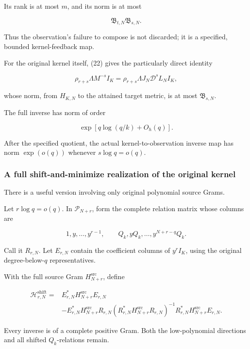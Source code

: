 \documentclass[11pt]{article}
\begin{document}
Its rank is at most \(m\), and its norm is at most

\[
\mathfrak B_{t,N}\mathfrak B_{s,N}.
\]

Thus the observation's failure to compose is not discarded; it is a specified, bounded kernel-feedback map.

For the original kernel itself, (22) gives the particularly direct identity

\[
\boxed{
\rho_{r+s}\Lambda M^{-s}I_K
=
\rho_{r+s}\Lambda J_N\mathscr D^sL_NI_K,
}
\tag{31}
\]

whose norm, from \(H_{K,N}\) to the attained target metric, is at most \(\mathfrak B_{s,N}\).

The full inverse has norm of order

\[
\exp[q\log(q/k)+O_h(q)].
\]

After the specified quotient, the actual kernel-to-observation inverse map has norm \(\exp(o(q))\) whenever \(s\log q=o(q)\).

\subsubsection{A full shift-and-minimize realization of the original kernel}\label{a-full-shift-and-minimize-realization-of-the-original-kernel}

There is a useful version involving only original polynomial source Grams.

Let \(r\log q=o(q)\). In \(\mathcal P_{N+r}\), form the complete relation matrix whose columns are

\[
1,y,\ldots,y^{r-1},
\qquad
Q_k,yQ_k,\ldots,y^{N+r-q}Q_k.
\]

Call it \(R_{r,N}\). Let \(E_{r,N}\) contain the coefficient columns of \(y^rI_K\), using the original degree-below-\(q\) representatives.

With the full source Gram \(H_{N+r}^{\mathrm{src}}\), define

\[
\boxed{
\begin{aligned}
\mathcal H^{\mathrm{shift}}_{r,N}
={}&E_{r,N}^*H_{N+r}^{\mathrm{src}}E_{r,N}\\
&-E_{r,N}^*H_{N+r}^{\mathrm{src}}R_{r,N}
(R_{r,N}^*H_{N+r}^{\mathrm{src}}R_{r,N})^{-1}
R_{r,N}^*H_{N+r}^{\mathrm{src}}E_{r,N}.
\end{aligned}
}
\tag{32}
\]

Every inverse is of a complete positive Gram. Both the low-polynomial directions and all shifted \(Q_k\)-relations remain.
\end{document}
